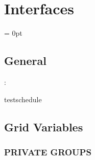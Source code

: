 
\section{Interfaces} 


\parskip = 0pt

\vspace{3mm} \subsection*{General}

: 

testschedule
\vspace{2mm}
\subsection*{Grid Variables}
\vspace{5mm}\subsubsection{PRIVATE GROUPS}

\vspace{5mm}

